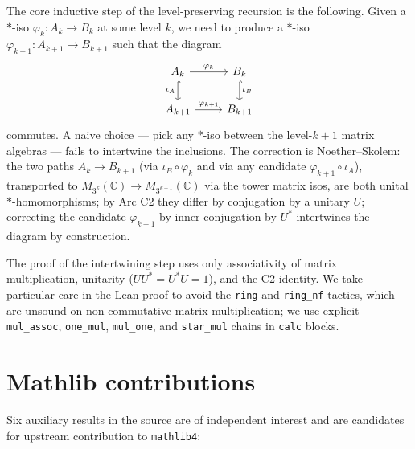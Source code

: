 \documentclass[11pt,a4paper]{article}
\theoremstyle{plain}
\theoremstyle{definition}
\begin{document}
The core inductive step of the level-preserving recursion is the following. Given a $\ast$-iso $\varphi_k : A_k \to B_k$ at some level $k$, we need to produce a $\ast$-iso $\varphi_{k+1} : A_{k+1} \to B_{k+1}$ such that the diagram
\[
\begin{tikzcd}
A_k \arrow[r, "\varphi_k"] \arrow[d, hook, "\iota_A"'] & B_k \arrow[d, hook, "\iota_B"] \\
A_{k+1} \arrow[r, "\varphi_{k+1}"] & B_{k+1}
\end{tikzcd}
\]
commutes. A naive choice --- pick any $\ast$-iso between the level-$k{+}1$ matrix algebras --- fails to intertwine the inclusions. The correction is Noether--Skolem: the two paths $A_k \to B_{k+1}$ (via $\iota_B \circ \varphi_k$ and via any candidate $\varphi_{k+1} \circ \iota_A$), transported to $M_{3^k}(\mathbb{C}) \to M_{3^{k+1}}(\mathbb{C})$ via the tower matrix isos, are both unital $\ast$-homomorphisms; by Arc C2 they differ by conjugation by a unitary $U$; correcting the candidate $\varphi_{k+1}$ by inner conjugation by $U^{\ast}$ intertwines the diagram by construction.

The proof of the intertwining step uses only associativity of matrix multiplication, unitarity ($U U^{\ast} = U^{\ast} U = 1$), and the C2 identity. We take particular care in the Lean proof to avoid the \texttt{ring} and \texttt{ring\_nf} tactics, which are unsound on non-commutative matrix multiplication; we use explicit \texttt{mul\_assoc}, \texttt{one\_mul}, \texttt{mul\_one}, and \texttt{star\_mul} chains in \texttt{calc} blocks.

\section{Mathlib contributions}
\label{sec:mathlib-gaps}

Six auxiliary results in the source are of independent interest and are candidates for upstream contribution to \texttt{mathlib4}:
\end{document}
